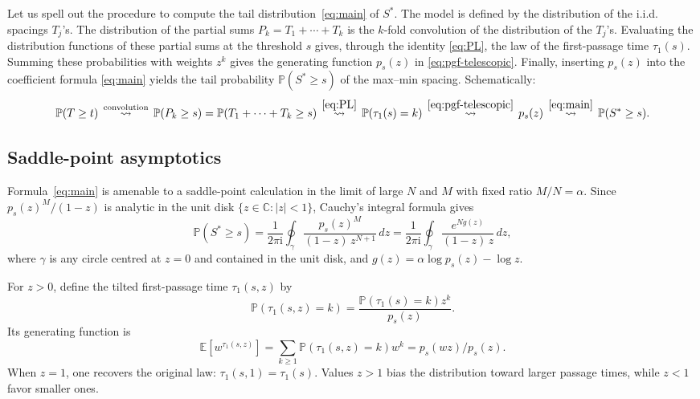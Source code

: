 \documentclass[a4paper,reqno,11pt]{amsart}
\numberwithin{equation}{section}
\def\C{{\mathbb C}}
\def\PR{\mathbb{P}}
\def\EE{{\mathbb E}}
\def\PP{{\mathbb P}}
\numberwithin{thm}{section}
\theoremstyle{plain}
\theoremstyle{definition}
\begin{document}
{Let us spell out the {procedure to compute the tail distribution~\eqref{eq:main} of $S^*$}. The model is defined by the distribution of the i.i.d. {spacings} $T_j$'s. The distribution of the partial sums
$P_k=T_1+\cdots+T_k$ is the $k$-fold convolution of the distribution of the $T_j$'s. Evaluating
the distribution functions of these partial sums at the threshold $s$ gives,
through the identity \eqref{eq:PL}, the law of the first-passage
time $\tau_1(s)$. Summing these probabilities with weights $z^k$ gives the
generating function $p_s(z)$ in \eqref{eq:pgf-telescopic}. Finally, inserting
$p_s(z)$ into the coefficient formula \eqref{eq:main} yields the tail
probability $\PP(S^*\geq s)$ of the max--min spacing. Schematically: 
\[
    \PP(T\geq t)
\,\stackrel{\text{convolution}}{\rightsquigarrow}\,
    \PP(P_k\geq s)=\PP(T_1+\cdots+T_k\geq s)
\,\stackrel{\eqref{eq:PL}}{\rightsquigarrow}\,
    \mathcal \PP(\tau_1(s)=k)
\,\stackrel{\eqref{eq:pgf-telescopic}}{\rightsquigarrow}\,
    p_s(z)
    \,	\stackrel{\eqref{eq:main}}{\rightsquigarrow}\,
    \PP(S^*\geq s).
\]


\subsection{Saddle-point asymptotics}
Formula~\eqref{eq:main} is amenable to a saddle-point calculation in the limit of large $N$ and $M$ with fixed ratio $M/N=\alpha$. Since $p_s(z)^M/(1-z)$ is analytic in the unit disk $\{z\in\C\colon |z|< 1\}$, Cauchy's integral formula gives
\begin{equation}\label{eq:P}
\PR(S^*\ge s)
  = \frac{1}{2\pi \mathrm{i}}\oint_{\gamma}
  \frac{p_s(z)^M}{(1-z)\,z^{N+1}}\,dz= \frac{1}{2\pi \mathrm{i}}\oint_{\gamma}
  \frac{e^{Ng(z)}}{(1{-}z)\,z}\,dz,
\end{equation}
where $\gamma$ is any circle centred at $z=0$ and contained in the unit disk, and $g(z)=\alpha\log p_s(z)-\log z$.


For $z>0$, define the  tilted first-passage time $\tau_1(s,z)$ by
\begin{equation}
   \mathbb{P}(\tau_1(s,z) = k)
= \frac{\mathbb{P}(\tau_1(s) = k)z^k }{p_s(z)}. 
\end{equation}
Its generating function is 
\begin{equation}
  \EE[w^{\tau_1(s,z)}] =\sum_{k\geq 1} \PP\left(\tau_1(s,z)=k\right)w^k= p_s(wz)/p_s(z).
\end{equation}
When $z=1$, one recovers the original law: $\tau_1(s,1)=\tau_1(s)$. Values $z>1$ bias the distribution toward larger passage times, while $z<1$ favor smaller ones.

}
\end{document}
